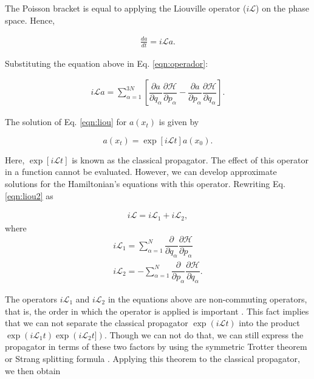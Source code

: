 The Poisson bracket is equal to applying the Liouville operator ($i\mathcal{L}$) on the phase space. Hence,

\begin{equation}
\begin{aligned}
\frac{da}{dt} = i\mathcal{L} a .
\end{aligned}
\label{eqn:liou}
\end{equation}

Substituting the equation above in Eq. \ref{eqn:operador}:

\begin{equation}
\begin{aligned}
i\mathcal{L} a = \sum_{\alpha=1}^{3N} \left [ \dfrac{\partial a}{\partial q_{\alpha}} \dfrac{\partial \mathcal{H}}{\partial p_{\alpha}}  - \dfrac{\partial a}{\partial p_{\alpha}} \dfrac{\partial \mathcal{H}}{\partial q_{\alpha}} \right].
\label{eqn:liou2}
\end{aligned}
\end{equation}

The solution of Eq. \ref{eqn:liou} for $a(x_{t})$ is given by

\begin{equation}
a(x_{t}) = \exp [i\mathcal{L}t] a(x_{0}).
\label{eqn:exactsol}
\end{equation}

Here, $\exp [i\mathcal{L}t]$ is known as the classical propagator. The effect of this operator in a function cannot be evaluated. However, we can develop approximate solutions for the Hamiltonian's equations with this operator. Rewriting Eq. \ref{eqn:liou2} as

\begin{equation}
\begin{aligned}
i\mathcal{L}  =  i\mathcal{L}_{1} + i\mathcal{L}_{2},
\end{aligned}
\end{equation}
where
\begin{equation}
\begin{aligned}
i\mathcal{L}_{1} = \sum_{\alpha=1}^{N}  \dfrac{\partial }{\partial q_{\alpha}} \dfrac{\partial \mathcal{H}}{\partial p_{\alpha}}   \\
i\mathcal{L}_{2} = - \sum_{\alpha=1}^{N} \dfrac{\partial }{\partial p_{\alpha}} \dfrac{\partial \mathcal{H}}{\partial q_{\alpha}} .
\end{aligned}
\end{equation}

The operators $i\mathcal{L}_{1}$ and $i\mathcal{L}_{2}$ in the equations above are non-commuting operators, that is, the order in which the operator is applied is important \cite{tuckerman}. This fact implies that we can not separate the classical propagator $\exp (i\mathcal{L}t)$  into the product $\exp (i\mathcal{L}_{1}t) \exp (i\mathcal{L}_{2}t])$. Though we can not do that, we can still express the propagator in terms of these two factors by using the symmetric Trotter theorem or Strang splitting formula \cite{trotter,strang}. Applying this theorem to the classical propagator, we then obtain

